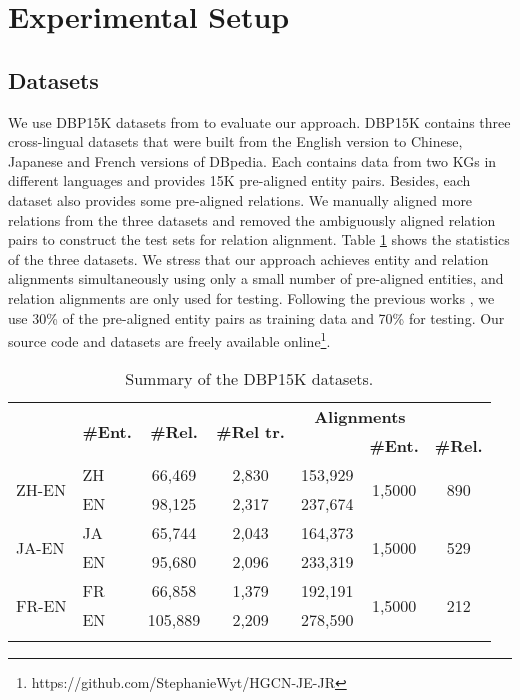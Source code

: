 \documentclass[11pt,a4paper]{article}
\begin{document}
\section{Experimental Setup}
\subsection{Datasets}
\label{subsection:datasets}
We use DBP15K datasets from \cite{sun2017cross} to evaluate our approach. DBP15K contains three cross-lingual datasets that were built from the English version to Chinese, Japanese and French versions of DBpedia. Each contains data from two KGs in different languages and provides 15K pre-aligned entity pairs. Besides, each dataset also provides some pre-aligned relations. We manually aligned more relations from the three datasets and removed the ambiguously aligned relation pairs to construct the test sets for relation alignment. Table \ref{dataset} shows the statistics of the three datasets. We stress that our approach achieves entity and relation alignments simultaneously using only a small number of pre-aligned entities, and relation alignments are only used for testing. Following the previous works \cite{sun2017cross,D18-1032,ijcai2018-611}, we use 30\% of the pre-aligned entity pairs as training data and 70\% for testing. Our source code and datasets are freely available online\footnote{https://github.com/StephanieWyt/HGCN-JE-JR}.

\begin{table}[t!]
	\centering
	\scriptsize
	\begin{tabular}{l|l|ccc|cc}
		\Xhline{1pt}
		\multicolumn{2}{c|}{\multirow{2}{*}{\bf DBP15K}} & \multirow{2}{*}{\textbf{\#Ent.}} & \multirow{2}{*}{\textbf{\#Rel.}} & \multirow{2}{*}{\textbf{\#Rel tr.}} & \multicolumn{2}{c}{\textbf{Alignments}}\\
		\multicolumn{1}{c}{} & \multicolumn{1}{c|}{} & & & & \textbf{\#Ent.} & \textbf{\#Rel.} \\
		\hline
		\multirow{2}{*}{ZH-EN} & ZH & 66,469 & 2,830 & 153,929 & \multirow{2}{*}{1,5000} & \multirow{2}{*}{890}\\
		& EN & 98,125 & 2,317 & 237,674 \\
		\hline
		\multirow{2}{*}{JA-EN} & JA & 65,744 & 2,043 & 164,373 & \multirow{2}{*}{1,5000} & \multirow{2}{*}{529} \\
		& EN & 95,680 & 2,096 & 233,319\\
		\hline
		\multirow{2}{*}{FR-EN} & FR & 66,858 & 1,379 & 192,191 & \multirow{2}{*}{1,5000} & \multirow{2}{*}{212} \\
		& EN & 105,889 & 2,209 & 278,590\\
		\Xhline{1pt}
	\end{tabular}
	\caption{Summary of the DBP15K datasets.}
	\label{dataset}
\end{table}
\end{document}
